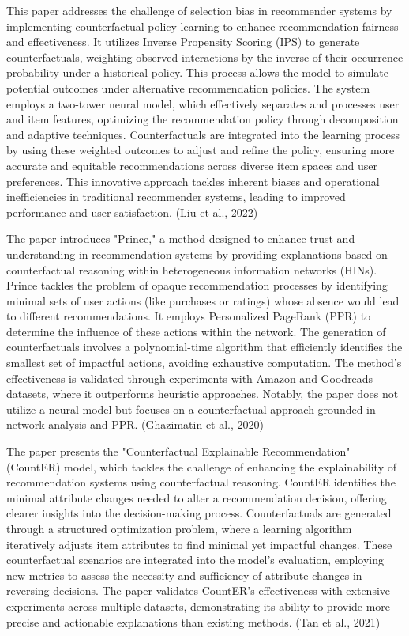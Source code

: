 This paper addresses the challenge of selection bias in recommender systems by implementing counterfactual policy learning to enhance recommendation fairness and effectiveness. It utilizes Inverse Propensity Scoring (IPS) to generate counterfactuals, weighting observed interactions by the inverse of their occurrence probability under a historical policy. This process allows the model to simulate potential outcomes under alternative recommendation policies. The system employs a two-tower neural model, which effectively separates and processes user and item features, optimizing the recommendation policy through decomposition and adaptive techniques. Counterfactuals are integrated into the learning process by using these weighted outcomes to adjust and refine the policy, ensuring more accurate and equitable recommendations across diverse item spaces and user preferences. This innovative approach tackles inherent biases and operational inefficiencies in traditional recommender systems, leading to improved performance and user satisfaction. (Liu et al., 2022)

The paper introduces "Prince," a method designed to enhance trust and understanding in recommendation systems by providing explanations based on counterfactual reasoning within heterogeneous information networks (HINs). Prince tackles the problem of opaque recommendation processes by identifying minimal sets of user actions (like purchases or ratings) whose absence would lead to different recommendations. It employs Personalized PageRank (PPR) to determine the influence of these actions within the network. The generation of counterfactuals involves a polynomial-time algorithm that efficiently identifies the smallest set of impactful actions, avoiding exhaustive computation. The method's effectiveness is validated through experiments with Amazon and Goodreads datasets, where it outperforms heuristic approaches. Notably, the paper does not utilize a neural model but focuses on a counterfactual approach grounded in network analysis and PPR. (Ghazimatin et al., 2020)

The paper presents the "Counterfactual Explainable Recommendation" (CountER) model, which tackles the challenge of enhancing the explainability of recommendation systems using counterfactual reasoning. CountER identifies the minimal attribute changes needed to alter a recommendation decision, offering clearer insights into the decision-making process. Counterfactuals are generated through a structured optimization problem, where a learning algorithm iteratively adjusts item attributes to find minimal yet impactful changes. These counterfactual scenarios are integrated into the model’s evaluation, employing new metrics to assess the necessity and sufficiency of attribute changes in reversing decisions. The paper validates CountER's effectiveness with extensive experiments across multiple datasets, demonstrating its ability to provide more precise and actionable explanations than existing methods. (Tan et al., 2021)
